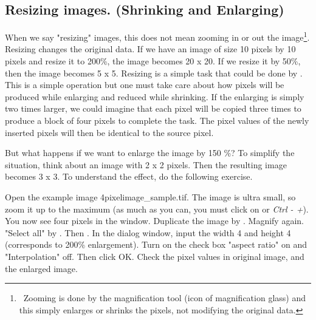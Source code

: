 \subsection{Resizing images. (Shrinking and Enlarging) }

When we say "resizing" images, this does not mean zooming in or out the
image\footnote{\ Zooming is done by the magnification tool (icon of
magnification glass) and this simply enlarges or shrinks the pixels, not
modifying the original data. \par }. Resizing changes the original data. If we
have an image of size 10 pixels by 10 pixels and resize it to 200\%, the image
becomes 20 x 20.
If we resize it by 50\%, then the image becomes 5 x 5. Resizing is a simple task
that could be done by . This is a simple
operation but one must take care about how pixels will be produced while
enlarging and reduced while shrinking. If the enlarging is simply two times
larger, we could imagine that each pixel will be copied three times to produce a
block of four pixels to complete the task. The pixel values of the newly
inserted pixels will then be identical to the source pixel.

But what happens if we want to enlarge the image by 150 \%? To simplify the
situation, think about an image with 2 x 2 pixels. Then the resulting image
becomes 3 x 3. To understand the effect, do the following exercise.


\begin{indentexercise}{1}
Open the example image
4pixelimage\_sample.tif. The image is ultra small, so zoom it
up to the maximum (as much as you can, you must click on or
\textit{Ctrl - +}). You now see four pixels in the window.
Duplicate the image by .
Magnify again. "Select all" by
.
Then .
In the dialog window, input the width 4 and height 4 (corresponds to
200\% enlargement). Turn on the check box "aspect
ratio" on and
"Interpolation" off. Then click
OK. Check the pixel values in original image, and the enlarged image.
\end{indentexercise}

